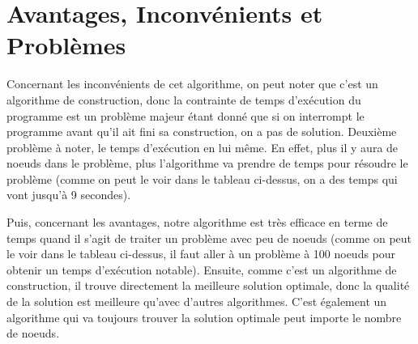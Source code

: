 \documentclass[a4paper,10pt]{article}
\begin{document}
\section{Avantages, Inconvénients et Problèmes}

\hspace{1cm}Concernant les inconvénients de cet algorithme, on peut noter que c'est un
algorithme de construction, donc la contrainte de temps d'exécution du 
programme est un problème majeur étant donné que si on interrompt le programme avant qu'il
ait fini sa construction, on a pas de solution. Deuxième problème à noter, 
le temps d'exécution en lui même. En effet, plus il y aura de noeuds dans le problème, plus 
l'algorithme va prendre de temps pour résoudre le problème (comme on peut le voir dans le tableau
ci-dessus, on a des temps qui vont jusqu'à 9 secondes). 

\hspace{0.5cm}Puis, concernant les avantages, notre algorithme est très efficace en terme de
temps quand il s'agit de traiter un problème avec peu de noeuds (comme on peut le voir dans 
le tableau ci-dessus, il faut aller à un problème à 100 noeuds pour obtenir un temps d'exécution 
notable). Ensuite, comme c'est un algorithme de construction, il trouve directement
la meilleure solution optimale, donc la qualité de la solution est meilleure qu'avec d'autres
algorithmes. C'est également un algorithme qui va toujours trouver la solution optimale peut importe le 
nombre de noeuds.\newline
\end{document}
